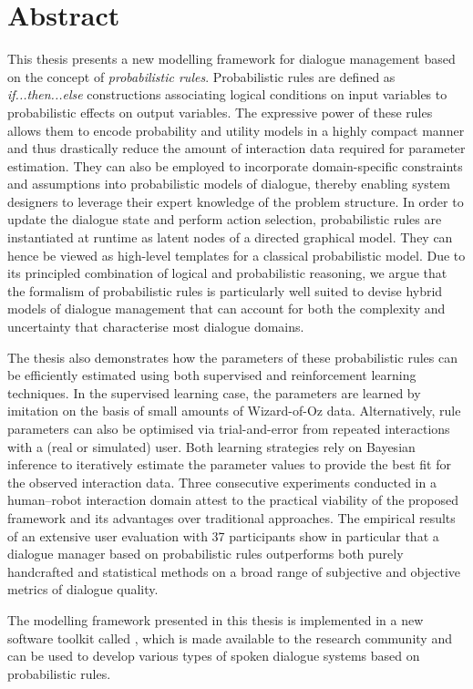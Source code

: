 \chapter*{Abstract}

This thesis presents a new modelling framework for dialogue management based on the concept of \textit{probabilistic rules}.  Probabilistic rules are defined as \textit{if...then...else} constructions associating logical conditions on input variables to probabilistic effects on output variables. The expressive power of these rules allows them to encode probability and utility models in a highly compact manner and thus drastically reduce the amount of interaction data required for parameter estimation. They can also be employed to incorporate domain-specific constraints and assumptions into probabilistic models of dialogue, thereby enabling system designers to leverage their expert knowledge of the problem structure.  In order to update the dialogue state and perform action selection, probabilistic rules are instantiated at runtime as latent nodes of a directed graphical model.  They can hence be viewed as high-level templates for a classical probabilistic model. Due to its principled combination of logical and probabilistic reasoning, we argue that the formalism of probabilistic rules is particularly well suited to devise hybrid models of dialogue management that can account for both the complexity and uncertainty that characterise most dialogue domains.

The thesis also demonstrates how the parameters of these probabilistic rules can be efficiently estimated using both supervised and reinforcement learning techniques. In the supervised learning case, the parameters are learned by imitation on the basis of small amounts of Wizard-of-Oz data.  Alternatively, rule parameters can also be optimised via trial-and-error from repeated interactions with a (real or simulated) user. Both learning strategies rely on Bayesian inference to iteratively estimate the parameter values to provide the best fit for the observed interaction data. Three consecutive experiments conducted in a human--robot interaction domain attest to the practical viability of the proposed framework and its advantages over traditional approaches.  The empirical results of an extensive user evaluation with 37 participants show in particular that a dialogue manager based on probabilistic rules outperforms both purely handcrafted and statistical methods on a broad range of subjective and objective metrics of dialogue quality.

The modelling framework presented in this thesis is implemented in a new software toolkit called \opendial{}, which is made available to the research community and can be used to develop various types of spoken dialogue systems based on probabilistic rules. 
